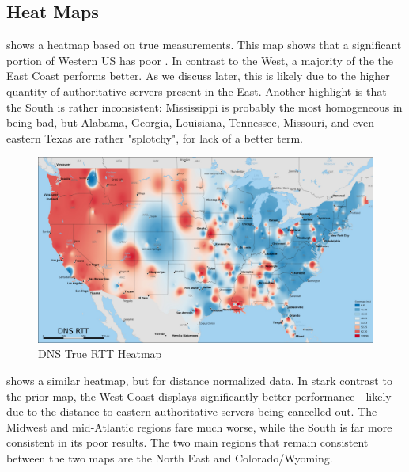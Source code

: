 \subsection{Heat Maps}

 shows a heatmap based on true \dns \rtt measurements. This map shows that a significant portion of Western US has poor \dns \rtts. In contrast to the West, a majority of the the East Coast performs better. As we discuss later, this is likely due to the higher quantity of authoritative servers present in the East. Another highlight is that the South is rather inconsistent: Mississippi is probably the most homogeneous in being bad, but Alabama, Georgia, Louisiana, Tennessee, Missouri, and even eastern Texas are rather "splotchy", for lack of a better term.

\begin{figure}[H]
    \centering
    \includegraphics[width=\textwidth]{images/dns/heatmaps/dns_rtt_idw.jpg}
    \caption{DNS True RTT Heatmap}
    \label{fig:dns_true_rtt_heatmap}
\end{figure}

 shows a similar heatmap, but for distance normalized \dns \rtt data. In stark contrast to the prior map, the West Coast displays significantly better performance - likely due to the distance to eastern authoritative servers being cancelled out. The Midwest and mid-Atlantic regions fare much worse, while the South is far more consistent in its poor results. The two main regions that remain consistent between the two maps are the North East and Colorado/Wyoming.

